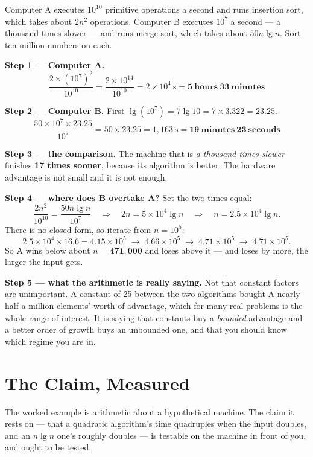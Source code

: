 \begin{worked}
Computer A executes $10^{10}$ primitive operations a second and runs insertion
sort, which takes about $2n^2$ operations. Computer B executes $10^{7}$ a
second --- a thousand times slower --- and runs merge sort, which takes about
$50 n \lg n$. Sort ten million numbers on each.

\smallskip
\textbf{Step 1 --- Computer A.}
\[ \frac{2 \times (10^{7})^{2}}{10^{10}}
   = \frac{2 \times 10^{14}}{10^{10}}
   = 2 \times 10^{4}\ \text{s} = \mathbf{5\ \text{hours}\ 33\ \text{minutes}} \]

\smallskip
\textbf{Step 2 --- Computer B.} First $\lg(10^{7}) = 7 \lg 10 = 7 \times 3.322
= 23.25$.
\[ \frac{50 \times 10^{7} \times 23.25}{10^{7}}
   = 50 \times 23.25 = 1{,}163\ \text{s}
   = \mathbf{19\ \text{minutes}\ 23\ \text{seconds}} \]

\smallskip
\textbf{Step 3 --- the comparison.} The machine that is \emph{a thousand times
slower} finishes \textbf{17 times sooner}, because its algorithm is better.
The hardware advantage is not small and it is not enough.

\smallskip
\textbf{Step 4 --- where does B overtake A?} Set the two times equal:
\[ \frac{2n^{2}}{10^{10}} = \frac{50 n \lg n}{10^{7}}
   \quad\Longrightarrow\quad 2n = 5 \times 10^{4} \lg n
   \quad\Longrightarrow\quad n = 2.5 \times 10^{4} \lg n. \]
There is no closed form, so iterate from $n = 10^{5}$:
\[ 2.5\!\times\!10^{4}\!\times\!16.6 = 4.15\!\times\!10^{5}
   \;\to\; 4.66\!\times\!10^{5} \;\to\; 4.71\!\times\!10^{5}
   \;\to\; 4.71\!\times\!10^{5}. \]
So A wins below about $n = \mathbf{471{,}000}$ and loses above it --- and loses
by more, the larger the input gets.

\smallskip
\textbf{Step 5 --- what the arithmetic is really saying.} Not that constant
factors are unimportant. A constant of 25 between the two algorithms bought A
nearly half a million elements' worth of advantage, which for many real
problems is the whole range of interest. It is saying that constants buy a
\emph{bounded} advantage and a better order of growth buys an unbounded one,
and that you should know which regime you are in.
\end{worked}

\section{The Claim, Measured}

The worked example is arithmetic about a hypothetical machine. The claim it
rests on --- that a quadratic algorithm's time quadruples when the input
doubles, and an $n\lg n$ one's roughly doubles --- is testable on the machine in
front of you, and ought to be tested.


